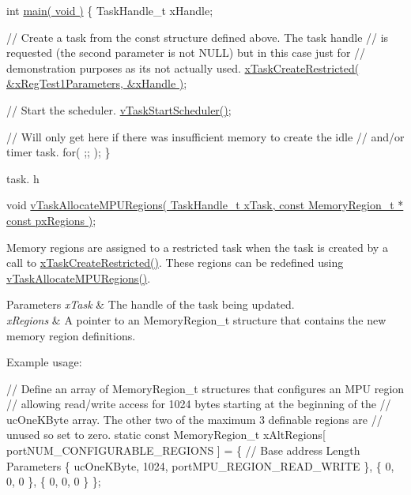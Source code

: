 \begin{DoxyPre}int \hyperlink{group__samples_ga840291bc02cba5474a4cb46a9b9566fe}{main( void )}
\{
TaskHandle\_t xHandle;\end{DoxyPre}



\begin{DoxyPre} // Create a task from the const structure defined above.  The task handle
 // is requested (the second parameter is not NULL) but in this case just for
 // demonstration purposes as its not actually used.
 \hyperlink{vendor_2ceedling_2plugins_2freertos_2src_2freertos_2include_2task_8h_a61b00cd623953f4f94fe794057d7f648}{xTaskCreateRestricted( &xRegTest1Parameters, &xHandle )};\end{DoxyPre}



\begin{DoxyPre} // Start the scheduler.
 \hyperlink{externals_2freertos_2include_2task_8h_aaf9dca1065c60abdeb309d56ab7293cb}{vTaskStartScheduler()};\end{DoxyPre}



\begin{DoxyPre} // Will only get here if there was insufficient memory to create the idle
 // and/or timer task.
 for( ;; );
\}
\end{DoxyPre}


task. h 
\begin{DoxyPre}
void \hyperlink{externals_2freertos_2include_2task_8h_ad889595baff9faf9efe02f3696825409}{vTaskAllocateMPURegions( TaskHandle\_t xTask, const MemoryRegion\_t * const pxRegions )};
\end{DoxyPre}


Memory regions are assigned to a restricted task when the task is created by a call to \hyperlink{vendor_2ceedling_2plugins_2freertos_2src_2freertos_2include_2task_8h_a61b00cd623953f4f94fe794057d7f648}{x\+Task\+Create\+Restricted()}. These regions can be redefined using \hyperlink{externals_2freertos_2include_2task_8h_ad889595baff9faf9efe02f3696825409}{v\+Task\+Allocate\+M\+P\+U\+Regions()}.


\begin{DoxyParams}{Parameters}
{\em x\+Task} & The handle of the task being updated.\\
\hline
{\em x\+Regions} & A pointer to an Memory\+Region\+\_\+t structure that contains the new memory region definitions.\\
\hline
\end{DoxyParams}
Example usage\+: 
\begin{DoxyPre}
// Define an array of MemoryRegion\_t structures that configures an MPU region
// allowing read/write access for 1024 bytes starting at the beginning of the
// ucOneKByte array.  The other two of the maximum 3 definable regions are
// unused so set to zero.
static const MemoryRegion\_t xAltRegions[ portNUM\_CONFIGURABLE\_REGIONS ] =
\{
 // Base address     Length      Parameters
 \{ ucOneKByte,       1024,       portMPU\_REGION\_READ\_WRITE \},
 \{ 0,                0,          0 \},
 \{ 0,                0,          0 \}
\};\end{DoxyPre}




